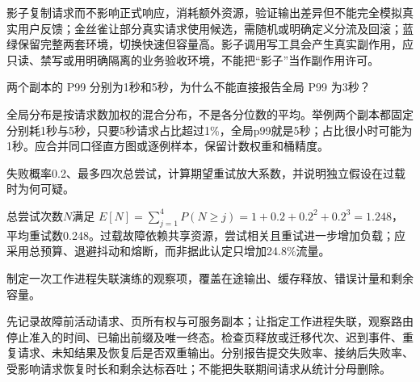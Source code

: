 \begin{exercises}
\begin{exercise}
\begin{solution}
影子复制请求而不影响正式响应，消耗额外资源，验证输出差异但不能完全模拟真实用户反馈；金丝雀让部分真实请求使用候选，需随机或明确定义分流及回滚；蓝绿保留完整两套环境，切换快速但容量高。影子调用写工具会产生真实副作用，应只读、禁写或用明确隔离的业务验收环境，不能把“影子”当作副作用许可。
\end{solution}
\end{exercise}

\begin{exercise} 两个副本的 P99 分别为1秒和5秒，为什么不能直接报告全局 P99 为3秒？

\begin{solution}
全局分布是按请求数加权的混合分布，不是各分位数的平均。举例两个副本都固定分别耗1秒与5秒，只要5秒请求占比超过1\%，全局p99就是5秒；占比很小时可能为1秒。应合并同口径直方图或逐例样本，保留计数权重和桶精度。
\end{solution}
\end{exercise}

\begin{exercise} 失败概率0.2、最多四次总尝试，计算期望重试放大系数，并说明独立假设在过载时为何可疑。

\begin{solution}
总尝试次数$N$满足 $E[N]=\sum_{j=1}^4P(N\ge j)=1+0.2+0.2^2+0.2^3=1.248$，平均重试数0.248。过载故障依赖共享资源，尝试相关且重试进一步增加负载；应采用总预算、退避抖动和熔断，而非据此认定只增加24.8\%流量。
\end{solution}
\end{exercise}

\begin{exercise} 制定一次工作进程失联演练的观察项，覆盖在途输出、缓存释放、错误计量和剩余容量。

\begin{solution}
先记录故障前活动请求、页所有权与可服务副本；让指定工作进程失联，观察路由停止准入的时间、已输出前缀及唯一终态。检查页释放或迁移代次、迟到事件、重复请求、未知结果及恢复后是否双重输出。分别报告提交失败率、接纳后失败率、受影响请求恢复时长和剩余达标吞吐；不能把失联期间请求从统计分母删除。
\end{solution}
\end{exercise}

\end{exercises}
